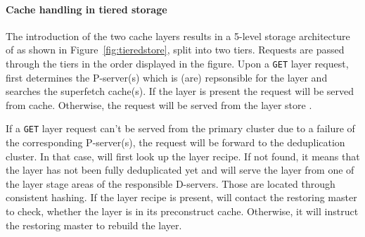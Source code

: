\paragraph{Cache handling in tiered storage} %
The introduction of the two cache layers results in a 5-level storage architecture of
\sysname as shown in Figure~\ref{fig:tieredstore}, split into two tiers.
 Requests are passed through the
tiers in the order displayed in the figure. Upon a \texttt{GET} layer request,
\sysname first determines the P-server(s) which is (are) repsonsible for the layer
and searches the superfetch cache(s).
If the layer is present the request will be served from cache.
Otherwise, the request will be served from the layer store .

If a \texttt{GET} layer request can't be served from the primary cluster
due to a failure of the corresponding P-server(s),
the request will be forward to the deduplication cluster.
In that case, \sysname will first look up the layer recipe. If not found, it means that
the layer has not been fully deduplicated yet and \sysname will serve the layer
from one of the layer stage areas of the responsible D-servers. Those are located
through consistent hashing.
If the layer recipe is present, \sysname will contact the restoring master to
check, whether the layer is in its preconstruct cache. Otherwise, it will
instruct the restoring master to rebuild the layer.

